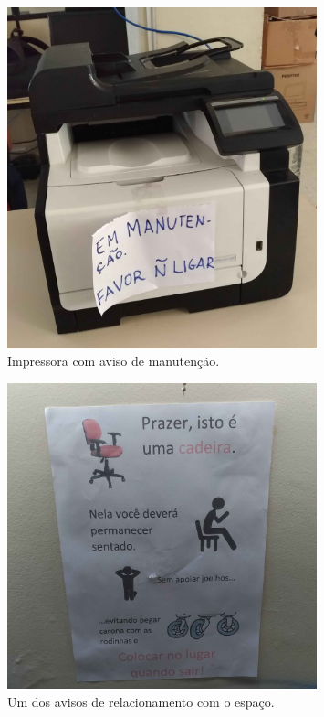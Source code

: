 \begin{figure}[ht]
  \centering
  \includegraphics[width=0.8\textwidth]{imagens/impressora.jpg}
  \caption{Impressora com aviso de manutenção.}
  \label{fig:LABEL_FIG_IMP}
\end{figure}

\begin{figure}[ht]
  \centering
  \includegraphics[width=0.8\textwidth]{imagens/aviso.jpg}
  \caption{Um dos avisos de relacionamento com o espaço.}
  \label{fig:LABEL_FIG_AVISO}
\end{figure}

